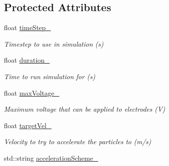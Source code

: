 \subsection*{Protected Attributes}
\begin{DoxyCompactItemize}
\item 
\hypertarget{classSimulationConfig_aae2c3cd4f770198029494a85519a1ece}{float \hyperlink{classSimulationConfig_aae2c3cd4f770198029494a85519a1ece}{time\+Step\+\_\+}}\label{classSimulationConfig_aae2c3cd4f770198029494a85519a1ece}

\begin{DoxyCompactList}\small\item\em Timestep to use in simulation (s) \end{DoxyCompactList}\item 
\hypertarget{classSimulationConfig_a38a9fef1e44df250737e659dfc0aa115}{float \hyperlink{classSimulationConfig_a38a9fef1e44df250737e659dfc0aa115}{duration\+\_\+}}\label{classSimulationConfig_a38a9fef1e44df250737e659dfc0aa115}

\begin{DoxyCompactList}\small\item\em Time to run simulation for (s) \end{DoxyCompactList}\item 
\hypertarget{classSimulationConfig_a105623d233f44f390c66d3c50ea81a53}{float \hyperlink{classSimulationConfig_a105623d233f44f390c66d3c50ea81a53}{max\+Voltage\+\_\+}}\label{classSimulationConfig_a105623d233f44f390c66d3c50ea81a53}

\begin{DoxyCompactList}\small\item\em Maximum voltage that can be applied to electrodes (V) \end{DoxyCompactList}\item 
\hypertarget{classSimulationConfig_a10aea8f60d0f2f7b0a2157eccb81ddce}{float \hyperlink{classSimulationConfig_a10aea8f60d0f2f7b0a2157eccb81ddce}{target\+Vel\+\_\+}}\label{classSimulationConfig_a10aea8f60d0f2f7b0a2157eccb81ddce}

\begin{DoxyCompactList}\small\item\em Velocity to try to accelerate the particles to (m/s) \end{DoxyCompactList}\item 
\hypertarget{classSimulationConfig_a4ddb30e70f6ba7adc77f827e5803e525}{std\+::string \hyperlink{classSimulationConfig_a4ddb30e70f6ba7adc77f827e5803e525}{acceleration\+Scheme\+\_\+}}\label{classSimulationConfig_a4ddb30e70f6ba7adc77f827e5803e525}


\end{DoxyCompactItemize}
